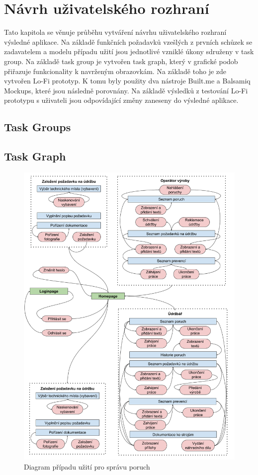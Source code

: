 \documentclass[thesis=M,czech]{FITthesis}[2012/06/26]
\begin{document}
\chapter{Návrh uživatelského rozhraní}
Tato kapitola se věnuje průběhu vytváření návrhu uživatelského rozhraní výsledné aplikace. Na základě funkčních požadavků vzešlých z prvních schůzek se zadavatelem a modelu případu užití jsou jednotlivé vzniklé úkony sdruženy v task group. Na základě task group je vytvořen task graph, který v grafické podob přiřazuje funkcionality k navrženým obrazovkám. Na základě toho je zde vytvořen Lo-Fi prototyp. K tomu byly použity dva nástroje Built.me a Balsamiq Mockups, které jsou následně porovnány. Na základě výsledků z testování Lo-Fi prototypu s uživateli jsou odpovídající změny zaneseny do výsledné aplikace.

\section{Task Groups}

\section{Task Graph}
\begin{figure}[H]
	\centering
	\includegraphics[width=1\textwidth]{images/task_graph.png}
	\caption{Diagram případu užití pro správu poruch}
	\label{img:uc_sprava_poruch}
\end{figure}
\end{document}
